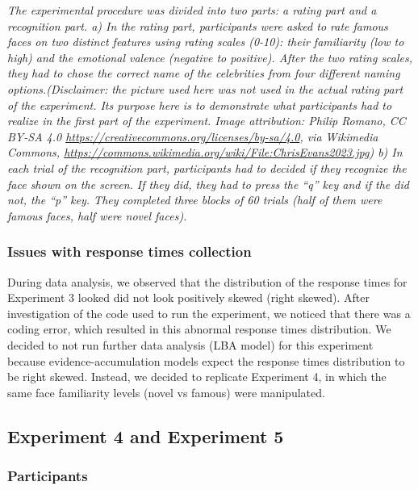 \documentclass[
  letterpaper,
  DIV=11,
  numbers=noendperiod]{scrartcl}
\begin{document}
\emph{The experimental procedure was divided into two parts: a rating
part and a recognition part. a) In the rating part, participants were
asked to rate famous faces on two distinct features using rating scales
(0-10): their familiarity (low to high) and the emotional valence
(negative to positive). After the two rating scales, they had to chose
the correct name of the celebrities from four different naming
options.(Disclaimer: the picture used here was not used in the actual
rating part of the experiment. Its purpose here is to demonstrate what
participants had to realize in the first part of the experiment. Image
attribution: Philip Romano, CC BY-SA 4.0
\url{https://creativecommons.org/licenses/by-sa/4.0}, via Wikimedia
Commons,
\url{https://commons.wikimedia.org/wiki/File:ChrisEvans2023.jpg}) b) In
each trial of the recognition part, participants had to decided if they
recognize the face shown on the screen. If they did, they had to press
the ``q'' key and if the did not, the ``p'' key. They completed three
blocks of 60 trials (half of them were famous faces, half were novel
faces).}

\subsubsection{Issues with response times
collection}\label{issues-with-response-times-collection}

During data analysis, we observed that the distribution of the response
times for Experiment 3 looked did not look positively skewed (right
skewed). After investigation of the code used to run the experiment, we
noticed that there was a coding error, which resulted in this abnormal
response times distribution. We decided to not run further data analysis
(LBA model) for this experiment because evidence-accumulation models
expect the response times distribution to be right skewed. Instead, we
decided to replicate Experiment 4, in which the same face familiarity
levels (novel vs famous) were manipulated.

\subsection{Experiment 4 and Experiment
5}\label{experiment-4-and-experiment-5}

\subsubsection{Participants}\label{participants-3}
\end{document}
